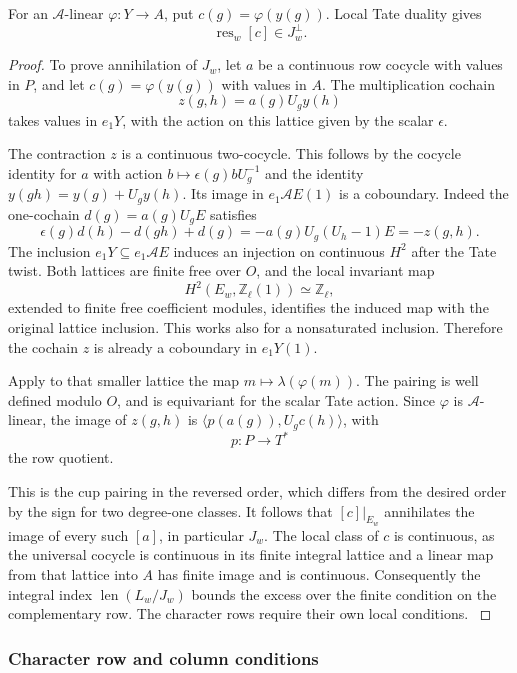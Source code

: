 \begin{lemma}
For an \(\mathcal A\)-linear \(\varphi:Y\to A\), put \(c(g)=\varphi(y(g))\). Local Tate duality gives
\[
 \operatorname{res}_w[c]\in J_w^\perp.
\]
\end{lemma}
\begin{proof}
To prove annihilation of \(J_w\), let \(a\) be a continuous
row cocycle with values in \(P\), and let \(c(g)=\varphi(y(g))\)
with values in \(A\). The multiplication cochain
\[ z(g,h)=a(g)U_g y(h) \]
takes values in \(e_1Y\), with the action on this lattice
given by the scalar \(\epsilon\).

The contraction \(z\) is a continuous two-cocycle. This follows by the cocycle identity for \(a\)
with action \(b\mapsto\epsilon(g)bU_g^{-1}\) and the
identity \(y(gh)=y(g)+U_g y(h)\). Its image in
\(e_1\mathcal A E(1)\) is a coboundary. Indeed the
one-cochain \(d(g)=a(g)U_g E\) satisfies
\[
 \epsilon(g)d(h)-d(gh)+d(g)=-a(g)U_g(U_h-1)E=-z(g,h).
\]
The inclusion \(e_1Y\subseteq e_1\mathcal A E\) induces an
injection on continuous \(H^2\) after the Tate twist. Both
lattices are finite free over \(O\), and the local invariant
map
\[
 H^2(E_w,\mathbb Z_\ell(1))\simeq\mathbb Z_\ell,
\]
extended to finite free coefficient modules, identifies the
induced map with the original lattice inclusion. This works
also for a nonsaturated inclusion. Therefore the cochain
\(z\) is already a coboundary in \(e_1Y(1)\).

Apply to that smaller lattice the map \(m\mapsto\lambda(\varphi(m))\).
The pairing is well defined modulo \(O\), and is equivariant
for the scalar Tate action. Since \(\varphi\) is
\(\mathcal A\)-linear, the image of \(z(g,h)\) is
\(\langle p(a(g)),U_g c(h)\rangle\), with
\[
 p:P\to T^*
\]
the row quotient.

This is the cup pairing in the reversed
order, which differs from the desired order by the sign
for two degree-one classes. It follows that \([c]|_{E_w}\)
annihilates the image of every such \([a]\), in particular
\(J_w\). The local class of \(c\) is continuous, as the
universal cocycle is continuous in its finite integral
lattice and a linear map from that lattice into \(A\) has
finite image and is continuous. Consequently the integral index \(\operatorname{len}(L_w/J_w)\) bounds the excess over the finite condition on the complementary row. The character rows require their own local conditions. \label{cor:split-selmer-4}
\end{proof}
\subsubsection*{Character row and column conditions}

